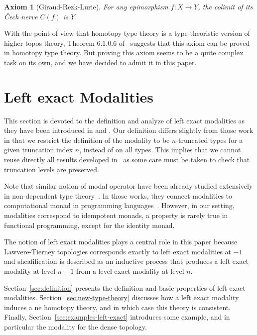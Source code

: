 \documentclass[conference]{IEEEtran}
\newtheorem{ax}[thm]{Axiom}
\begin{document}
\begin{ax}[Giraud-Rezk-Lurie]
  For any epimorphism $f : X \to Y$, the colimit of its \v{C}ech nerve
  $C(f)$ is $Y$.
\end{ax}

With the point of view that homotopy type theory is a type-theoristic
version of higher topos theory, Theorem 6.1.0.6 of~\cite{lurie}
suggests that this axiom can be proved in homotopy type theory. 
%
But proving this axiom seems to be a quite complex task on its own,
and we have decided to admit it in this paper.



\section{Left exact Modalities}
\label{sec:lexmod}

This section is devoted to the definition and analyze of left exact
modalities as they have been introduced in \cite{hottbook} and
\cite{shulman-higher-modalities}. Our definition differs slightly from
those work in that we restrict the definition of the modality to be
$n$-truncated types for a given truncation index $n$, instead of on
all types.
%
This implies that we cannot reuse directly all results developed
in~\cite{hottbook} as some care must be taken to check that truncation
levels are preserved.

Note that similar notion of modal operator have been already studied
extensively in non-dependent type
theory~\cite{benton1998computational}. In those works, they connect
modalities to computational monad in programming
languages~\cite{moggi-monad}. However, in our setting, modalities
correspond to idempotent monads, a property is rarely true 
in functional programming, except for the identity monad.

The notion of left exact modalities plays a central role in this paper
because Lawvere-Tierney topologies corresponds exactly to left exact
modalities at $-1$ and sheafification is described as an inductive
process that produces a left exact modality at level $n+1$ from a
level exact modality at level $n$. 

Section~\ref{sec:definition} presents the definition and basic
properties of left exact modalities. 
%
Section~\ref{sec:new-type-theory} discusses how a left exact modality
induces a ne homotopy theory, and in which case this theory is
consistent.
%
Finally, Section~\ref{sec:examples-left-exact} introduces some
example, and in particular the modality for the dense topology.
\end{document}
